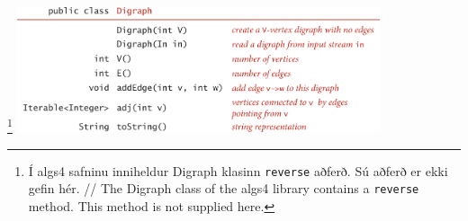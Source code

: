 \documentclass[addpoints]{exam}
\begin{document}
\begin{questions}
\begin{center}
\vspace{1cm}
\footnote{Í algs4 safninu inniheldur Digraph klasinn \texttt{reverse} aðferð. Sú aðferð er ekki gefin hér. // The Digraph class of the algs4 library contains a \texttt{reverse} method. This method is not supplied here.}
\includegraphics[width=0.8\textwidth]{Pics/API-Digraph}





\end{center}


\end{questions}
\end{document}
